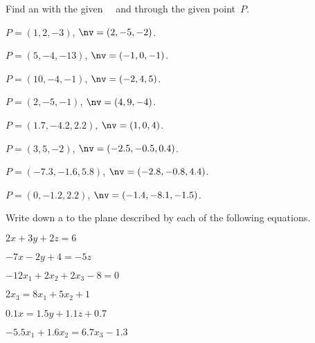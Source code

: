 \begin{exercise}  
Find an  with the given ~\nv\ and through the given point~\(P\).
\begin{Parts}
\item \(P=(1,2,-3)\), \(\nv=(2,-5,-2)\).
\item \(P=(5,-4,-13)\), \(\nv=(-1,0,-1)\).
\begin{reduce}
\item \(P=(10,-4,-1)\), \(\nv=(-2,4,5)\).
\item \(P=(2,-5,-1)\), \(\nv=(4,9,-4)\).
\item \(P=(1.7,-4.2,2.2)\), \(\nv=( 1,0,4)\).
\item \(P=(3,5,-2)\), \(\nv=(-2.5,-0.5,0.4)\).
\end{reduce}
\item \(P=(-7.3,-1.6,5.8)\), \(\nv=(-2.8,-0.8,4.4)\).
\item \(P=(0,-1.2,2.2)\), \(\nv=(-1.4,-8.1,-1.5)\).
\end{Parts}
\end{exercise}




\begin{exercise}  
Write down a  to the plane described by each of the following equations.
\begin{Parts}
\item \(2x+3y+2z=6\)
\item \(-7x-2y+4=-5z\)
\begin{reduce}
\item \(-12x_1+2x_2+2x_3-8=0\)
\item \(2x_3=8x_1+5x_2+1\)
\end{reduce}
\item \(0.1x=1.5y+1.1z+0.7\)
\item \(-5.5x_1+1.6x_2=6.7x_3-1.3\)
\end{Parts}
\end{exercise}


